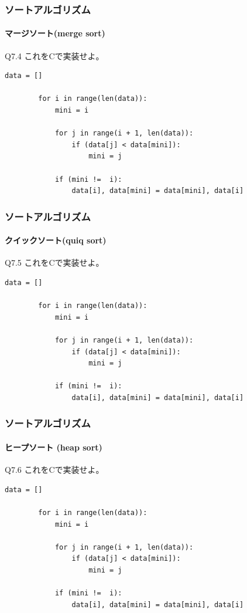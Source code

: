 \documentclass[dvipdfmx]{beamer}
\begin{document}
\begin{frame}[t, fragile]
    \frametitle{ソートアルゴリズム}
    \framesubtitle{マージソート(merge sort)}
    \begin{itembox}[l]{Q7.4}
        これをCで実装せよ。
    \end{itembox}
    \begin{lstlisting}[gobble=8, caption=mergeSort.py, label=mergeSort]
        data = []

        for i in range(len(data)):
            mini = i

            for j in range(i + 1, len(data)):
                if (data[j] < data[mini]):
                    mini = j

            if (mini !=  i):
                data[i], data[mini] = data[mini], data[i]
    \end{lstlisting}
\end{frame}

\begin{frame}[t, fragile]
    \frametitle{ソートアルゴリズム}
    \framesubtitle{クイックソート(quiq sort)}
    \begin{itembox}[l]{Q7.5}
        これをCで実装せよ。
    \end{itembox}
    \begin{lstlisting}[gobble=8, caption=mergeSort.py, label=mergeSort]
        data = []

        for i in range(len(data)):
            mini = i

            for j in range(i + 1, len(data)):
                if (data[j] < data[mini]):
                    mini = j

            if (mini !=  i):
                data[i], data[mini] = data[mini], data[i]
    \end{lstlisting}
\end{frame}

\begin{frame}[t, fragile]
    \frametitle{ソートアルゴリズム}
    \framesubtitle{ヒープソート (heap sort)}
    \begin{itembox}[l]{Q7.6}
        これをCで実装せよ。
    \end{itembox}
    \begin{lstlisting}[gobble=8, caption=mergeSort.py, label=mergeSort]
        data = []

        for i in range(len(data)):
            mini = i

            for j in range(i + 1, len(data)):
                if (data[j] < data[mini]):
                    mini = j

            if (mini !=  i):
                data[i], data[mini] = data[mini], data[i]
    \end{lstlisting}
\end{frame}
\end{document}

